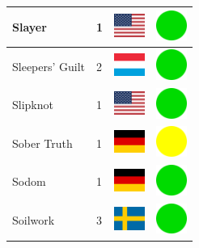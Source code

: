 \documentclass[12pt, a4paper, twoside]{report}
\begin{document}
\begin{center}
\begin{longtable}{|p{5cm}|p{2cm}|p{2cm}|p{2cm}|}
			Slayer & 1 & \includegraphics[width=1cm]{4x3/us} & \includegraphics[width=1cm]{likes/y} \\ \hline
			Sleepers' Guilt & 2 & \includegraphics[width=1cm]{4x3/lu} & \includegraphics[width=1cm]{likes/y} \\ \hline
			Slipknot & 1 & \includegraphics[width=1cm]{4x3/us} & \includegraphics[width=1cm]{likes/y} \\ \hline
			Sober Truth & 1 & \includegraphics[width=1cm]{4x3/de} & \includegraphics[width=1cm]{likes/m} \\ \hline
			Sodom & 1 & \includegraphics[width=1cm]{4x3/de} & \includegraphics[width=1cm]{likes/y} \\ \hline
			Soilwork & 3 & \includegraphics[width=1cm]{4x3/se} & \includegraphics[width=1cm]{likes/y} \\ \hline

\end{longtable}
\end{center}
\end{document}
